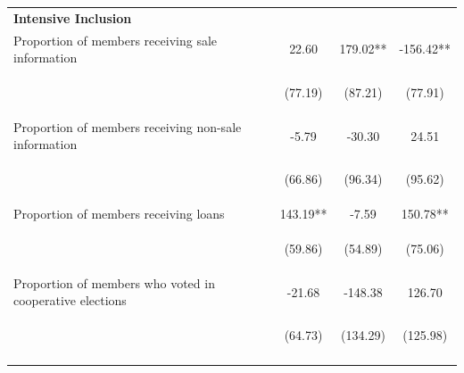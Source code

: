 \documentclass[11pt]{article}
\begin{document}
\begin{table}[H]
{\begin{tabularx}{1.1\linewidth}{lccc}
 \textbf{Intensive Inclusion} & & & \\
\noalign{\smallskip}Proportion of members receiving sale information & 22.60 & 179.02** & -156.42**\\
 & \begin{footnotesize}(77.19)\end{footnotesize} & \begin{footnotesize}(87.21)\end{footnotesize} & \begin{footnotesize}(77.91)\end{footnotesize}\\
\noalign{\smallskip}Proportion of members receiving non-sale information & -5.79 & -30.30 & 24.51\\
 & \begin{footnotesize}(66.86)\end{footnotesize} & \begin{footnotesize}(96.34)\end{footnotesize} & \begin{footnotesize}(95.62)\end{footnotesize}\\
\noalign{\smallskip}Proportion of members receiving loans & 143.19** & -7.59 & 150.78**\\
 & \begin{footnotesize}(59.86)\end{footnotesize} & \begin{footnotesize}(54.89)\end{footnotesize} & \begin{footnotesize}(75.06)\end{footnotesize}\\
\noalign{\smallskip}Proportion of members who voted in cooperative elections & -21.68 & -148.38 & 126.70\\
 & \begin{footnotesize}(64.73)\end{footnotesize} & \begin{footnotesize}(134.29)\end{footnotesize} & \begin{footnotesize}(125.98)\end{footnotesize}\\
\noalign{\smallskip}\hline
  \end{tabularx}}
\end{table}
\doublespacing
\end{document}
